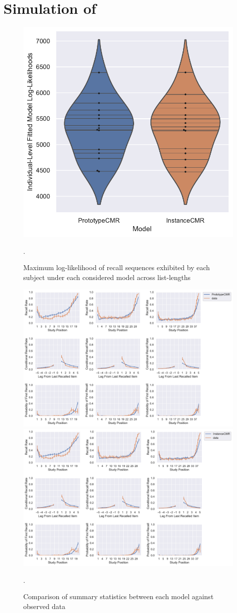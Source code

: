 \documentclass{article}
\begin{document}
\section{Simulation of \citet{murdock1962serial}}

\begin{figure}[h]
  \centering
  \includegraphics[width=.5\textwidth]{individual_murdock1962.pdf}
  \caption{Maximum log-likelihood of recall sequences exhibited by each subject under each considered model across list-lengths \citep{murdock1962serial}}.
  \label{fig:Murd62Fits}
\end{figure}

\begin{figure}[h]
  \centering
  \includegraphics[width=.9\textwidth]{cmr_summary_murdock1962.pdf}
  \includegraphics[width=.9\textwidth]{icmr_summary_murdock1962.pdf}
  \caption{Comparison of summary statistics between each model against observed data \citep{murdock1962serial}}.
  \label{fig:Murd62Summary}
\end{figure}
\end{document}
